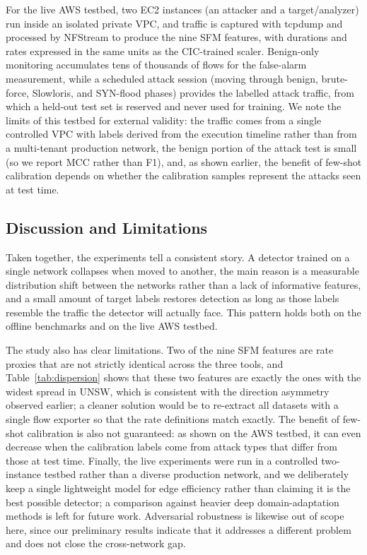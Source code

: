 \documentclass[11pt,a4paper]{article}
\begin{document}
For the live AWS testbed, two EC2 instances (an attacker and a target/analyzer) run inside
an isolated private VPC, and traffic is captured with tcpdump and processed by NFStream to
produce the nine SFM features, with durations and rates expressed in the same units as the
CIC-trained scaler. Benign-only monitoring accumulates tens of thousands of flows for the
false-alarm measurement, while a scheduled attack session (moving through benign,
brute-force, Slowloris, and SYN-flood phases) provides the labelled attack traffic, from
which a held-out test set is reserved and never used for training. We note the limits of
this testbed for external validity: the traffic comes from a single controlled VPC with
labels derived from the execution timeline rather than from a multi-tenant production
network, the benign portion of the attack test is small (so we report MCC rather than F1),
and, as shown earlier, the benefit of few-shot calibration depends on whether the
calibration samples represent the attacks seen at test time.

\subsection{Discussion and Limitations}
Taken together, the experiments tell a consistent story. A detector trained on a single
network collapses when moved to another, the main reason is a measurable distribution
shift between the networks rather than a lack of informative features, and a small amount
of target labels restores detection as long as those labels resemble the traffic the
detector will actually face. This pattern holds both on the offline benchmarks and on the
live AWS testbed.

The study also has clear limitations. Two of the nine SFM features are rate proxies that
are not strictly identical across the three tools, and Table~\ref{tab:dispersion} shows
that these two features are exactly the ones with the widest spread in UNSW, which is
consistent with the direction asymmetry observed earlier; a cleaner solution would be to
re-extract all datasets with a single flow exporter so that the rate definitions match
exactly. The benefit of few-shot calibration is also not guaranteed: as shown on the AWS
testbed, it can even decrease when the calibration labels come from attack types that
differ from those at test time. Finally, the live experiments were run in a controlled
two-instance testbed rather than a diverse production network, and we deliberately keep a
single lightweight model for edge efficiency rather than claiming it is the best possible
detector; a comparison against heavier deep domain-adaptation methods is left for future
work. Adversarial robustness is likewise out of scope here, since our preliminary results
indicate that it addresses a different problem and does not close the cross-network gap.
\end{document}
